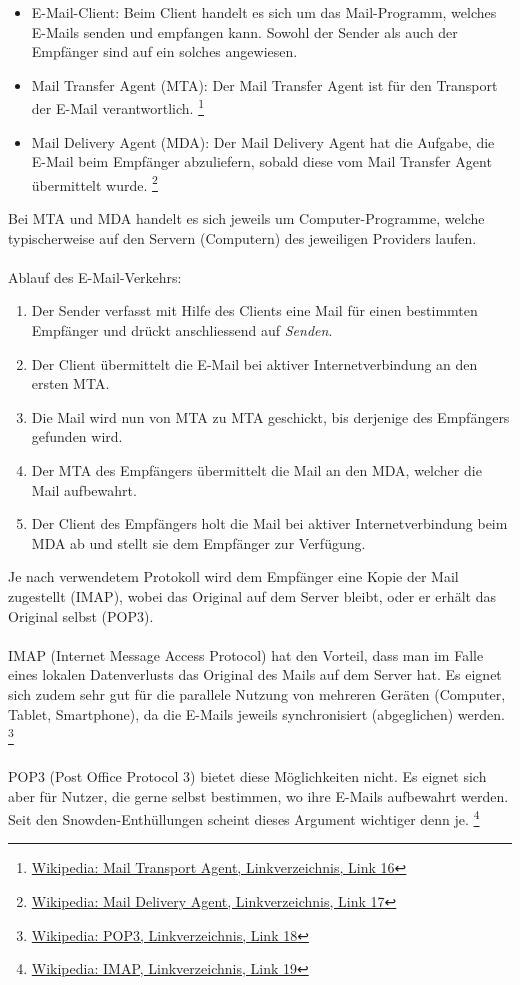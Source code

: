 \begin{itemize}
\item E-Mail-Client: Beim Client handelt es sich um das Mail-Programm, welches E-Mails senden und empfangen kann. Sowohl der Sender als auch der Empfänger sind auf ein solches angewiesen.
\item Mail Transfer Agent (MTA): Der Mail Transfer Agent ist für den Transport der E-Mail verantwortlich.
\footnote{\hyperlink{link16}{Wikipedia: Mail Transport Agent, Linkverzeichnis, Link 16}}
\item Mail Delivery Agent (MDA): Der Mail Delivery Agent hat die Aufgabe, die E-Mail beim Empfänger abzuliefern, sobald diese vom Mail Transfer Agent übermittelt wurde.
\footnote{\hyperlink{link17}{Wikipedia: Mail Delivery Agent, Linkverzeichnis, Link 17}}
\end{itemize}

Bei MTA und MDA handelt es sich jeweils um Computer-Programme, welche typischerweise auf den Servern (Computern) des jeweiligen Providers laufen.
\\
\\
Ablauf des E-Mail-Verkehrs:

\begin{enumerate}
\item Der Sender verfasst mit Hilfe des Clients eine Mail für einen bestimmten Empfänger und drückt anschliessend auf \textit{Senden}.
\item Der Client übermittelt die E-Mail bei aktiver Internetverbindung an den ersten MTA.
\item Die Mail wird nun von MTA zu MTA geschickt, bis derjenige des Empfängers gefunden wird.
\item Der MTA des Empfängers übermittelt die Mail an den MDA, welcher die Mail aufbewahrt.
\item Der Client des Empfängers holt die Mail bei aktiver Internetverbindung beim MDA ab und stellt sie dem Empfänger zur Verfügung.
\end{enumerate}

Je nach verwendetem Protokoll wird dem Empfänger eine Kopie der Mail zugestellt (IMAP), wobei das Original auf dem Server bleibt, oder er erhält das Original selbst (POP3).
\\
\\
IMAP (Internet Message Access Protocol) hat den Vorteil, dass man im Falle eines lokalen Datenverlusts das Original des Mails auf dem Server hat. Es eignet sich zudem sehr gut für die parallele Nutzung von mehreren Geräten (Computer, Tablet, Smartphone), da die E-Mails jeweils synchronisiert (abgeglichen) werden.
\footnote{\hyperlink{link18}{Wikipedia: POP3, Linkverzeichnis, Link 18}}
\\
\\
POP3 (Post Office Protocol 3) bietet diese Möglichkeiten nicht. Es eignet sich aber für Nutzer, die gerne selbst bestimmen, wo ihre E-Mails aufbewahrt werden. Seit den Snowden-Enthüllungen scheint dieses Argument wichtiger denn je.
\footnote{\hyperlink{link19}{Wikipedia: IMAP, Linkverzeichnis, Link 19}}

